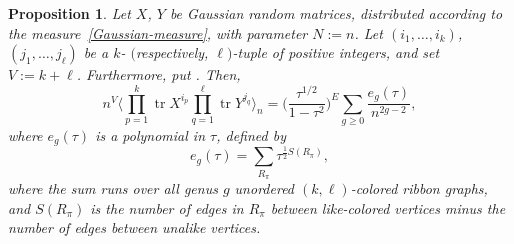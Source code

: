 \documentclass[10pt,a4paper]{amsart}
\DeclareMathOperator{\tr}{tr}
\numberwithin{equation}{section}
\newtheorem{Proposition}[Theorem]{Proposition}
 { \theoremstyle{definition}
\newtheorem{Definition}[Theorem]{Definition}
\newtheorem{Note}[Theorem]{Note}
\newtheorem{Example}[Theorem]{Example}
\newtheorem{Remark}[Theorem]{Remark} }
\begin{document}
\begin{Proposition}
 Let $X$, $Y$ be Gaussian random matrices, distributed according to the measure~\eqref{Gaussian-measure}, with parameter $N := n$. Let
 $(i_1,\dots,i_k)$, $(j_1,\dots,j_\ell)$ be a $k$- $($respectively, $\ell)$-tuple of positive integers, and set $V := k+\ell$. Furthermore, put
 . Then,
 \begin{equation*}
 n^{V}\Biggl\langle \prod_{p=1}^k \tr X^{i_p}\prod_{q = 1}^\ell \tr Y^{j_q}\Biggr\rangle_n
 = \biggl(\frac{\tau^{1/2}}{1-\tau^2}\biggr)^E\sum_{g\geq 0} \frac{e_g(\tau)}{n^{2g-2}},
 \end{equation*}
 where $e_g(\tau)$ is a polynomial in $\tau$, defined by
 \begin{equation*}
 e_g(\tau) = \sum_{R_{\pi} } \tau^{\frac{1}{2}S(R_{\pi})},
 \end{equation*}
 where the sum runs over all genus $g$ unordered $(k,\ell)$-colored ribbon graphs, and $S(R_{\pi})$ is the number of edges in $R_{\pi}$ between
 like-colored vertices minus the number of edges between unalike vertices.
\end{Proposition}
\end{document}
